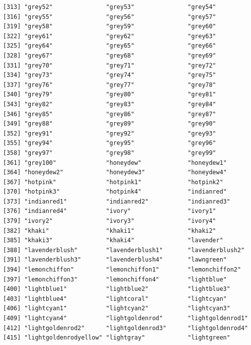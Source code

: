 \documentclass[a4paperpaper,]{article}
\theoremstyle{definition}
\theoremstyle{definition}
\theoremstyle{definition}
\theoremstyle{remark}
\begin{document}
\begin{verbatim}
[313] "grey52"               "grey53"               "grey54"              
[316] "grey55"               "grey56"               "grey57"              
[319] "grey58"               "grey59"               "grey60"              
[322] "grey61"               "grey62"               "grey63"              
[325] "grey64"               "grey65"               "grey66"              
[328] "grey67"               "grey68"               "grey69"              
[331] "grey70"               "grey71"               "grey72"              
[334] "grey73"               "grey74"               "grey75"              
[337] "grey76"               "grey77"               "grey78"              
[340] "grey79"               "grey80"               "grey81"              
[343] "grey82"               "grey83"               "grey84"              
[346] "grey85"               "grey86"               "grey87"              
[349] "grey88"               "grey89"               "grey90"              
[352] "grey91"               "grey92"               "grey93"              
[355] "grey94"               "grey95"               "grey96"              
[358] "grey97"               "grey98"               "grey99"              
[361] "grey100"              "honeydew"             "honeydew1"           
[364] "honeydew2"            "honeydew3"            "honeydew4"           
[367] "hotpink"              "hotpink1"             "hotpink2"            
[370] "hotpink3"             "hotpink4"             "indianred"           
[373] "indianred1"           "indianred2"           "indianred3"          
[376] "indianred4"           "ivory"                "ivory1"              
[379] "ivory2"               "ivory3"               "ivory4"              
[382] "khaki"                "khaki1"               "khaki2"              
[385] "khaki3"               "khaki4"               "lavender"            
[388] "lavenderblush"        "lavenderblush1"       "lavenderblush2"      
[391] "lavenderblush3"       "lavenderblush4"       "lawngreen"           
[394] "lemonchiffon"         "lemonchiffon1"        "lemonchiffon2"       
[397] "lemonchiffon3"        "lemonchiffon4"        "lightblue"           
[400] "lightblue1"           "lightblue2"           "lightblue3"          
[403] "lightblue4"           "lightcoral"           "lightcyan"           
[406] "lightcyan1"           "lightcyan2"           "lightcyan3"          
[409] "lightcyan4"           "lightgoldenrod"       "lightgoldenrod1"     
[412] "lightgoldenrod2"      "lightgoldenrod3"      "lightgoldenrod4"     
[415] "lightgoldenrodyellow" "lightgray"            "lightgreen"          

\end{verbatim}
\end{document}
